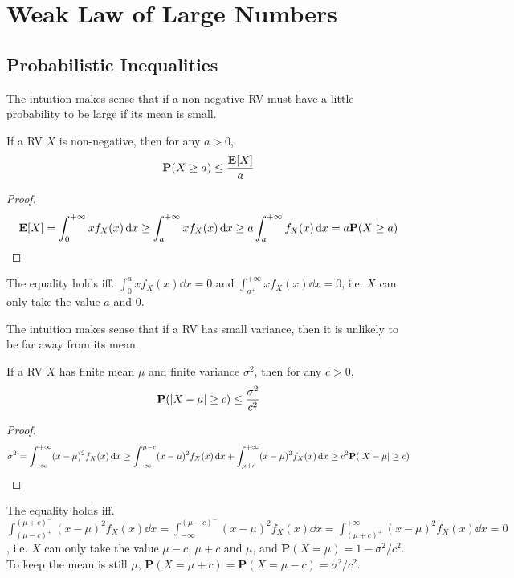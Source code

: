 \chapter{Weak Law of Large Numbers}

\section{Probabilistic Inequalities}
The intuition makes sense that if a non-negative RV must have a little probability to be large if its mean is small.
\begin{theorem}
    If a RV $X$ is non-negative, then for any $a > 0$,
    \begin{equation}
        \mathbf{P}(X \geq a) \leq \frac{\mathbf{E}[X]}{a}
    \end{equation}
\end{theorem}
\begin{proof}
    \begin{equation}
        \mathbf{E}[X] = \int_{0}^{+\infty} xf_X(x) \dd{x} \geq \int_{a}^{+\infty} xf_X(x) \dd{x} \geq a\int_{a}^{+\infty} f_X(x) \dd{x} = a \mathbf{P}(X \geq a)
    \end{equation}
\end{proof}
The equality holds iff. $\int_{0}^{a} xf_X(x) \dd{x} = 0$ and $\int_{a^+}^{+\infty} xf_X(x) \dd{x} = 0$, i.e. $X$ can only take the value $a$ and $0$.

The intuition makes sense that if a RV has small variance, then it is unlikely to be far away from its mean.
\begin{theorem}
    If a RV $X$ has finite mean $\mu$ and finite variance $\sigma^2$, then for any $c > 0$,
    \begin{equation}
        \mathbf{P}(\abs{X - \mu} \geq c) \leq \frac{\sigma^2}{c^2}
    \end{equation}
\end{theorem}
\begin{proof}
    \begin{equation}
        \sigma^2 = \int_{-\infty}^{+\infty} (x - \mu)^2 f_X(x) \dd{x} \geq \int_{-\infty}^{\mu - c} (x - \mu)^2 f_X(x) \dd{x} + \int_{\mu + c}^{+\infty} (x - \mu)^2 f_X(x) \dd{x} \geq c^2 \mathbf{P}(\abs{X - \mu} \geq c)
    \end{equation}
\end{proof}
The equality holds iff. $\int_{(\mu-c)^+}^{(\mu+c)^-} (x - \mu)^2 f_X(x) \dd{x} = \int_{-\infty}^{(\mu-c)^-} (x - \mu)^2 f_X(x) \dd{x} = \int_{(\mu+c)^{+}}^{+\infty} (x - \mu)^2 f_X(x) \dd{x} = 0$, i.e. $X$ can only take the value $\mu - c$, $\mu + c$ and $\mu$, and $\mathbf{P}(X = \mu) = 1 - \sigma^2/c^2$. To keep the mean is still $\mu$, $\mathbf{P}(X = \mu + c) = \mathbf{P}(X = \mu - c) = \sigma^2/c^2$.


